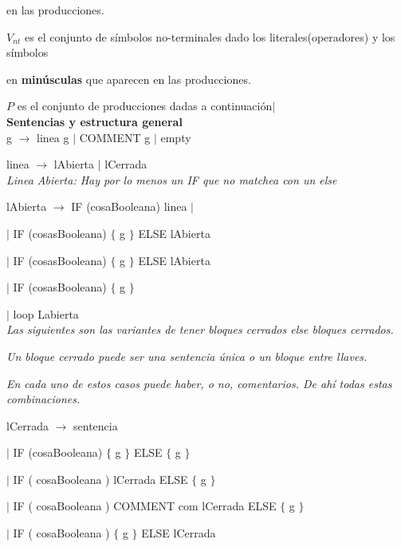en las producciones.


$V_{nt}$ es el conjunto de símbolos no-terminales dado los literales(operadores) y los símbolos

en \textbf{minúsculas} que aparecen en las producciones.



$P$ es el conjunto de producciones dadas a continuación$|$\\


\textbf{Sentencias y estructura general} \\

g $\rightarrow$ linea g $|$ COMMENT g $|$ empty 

linea $\rightarrow$ lAbierta $|$ lCerrada \\


\textit{Linea Abierta: Hay por lo menos un IF que no matchea con un else} 

lAbierta $\rightarrow$ IF (cosaBooleana) linea $|$

\hspace{15mm}$|$ IF (cosasBooleana) $\{$ g $\}$ ELSE lAbierta

\hspace{15mm}$|$ IF (cosasBooleana) $\{$ g $\}$ ELSE lAbierta

\hspace{15mm}$|$ IF (cosasBooleana) $\{$ g $\}$ 

\hspace{15mm}$|$ loop Labierta \\

\textit{Las siguientes son las variantes de tener bloques cerrados else bloques cerrados.}

\textit{Un bloque cerrado puede ser una sentencia única o un bloque entre llaves.}

\textit{En cada uno de estos casos puede haber, o no, comentarios. De ahí todas estas combinaciones.} 


lCerrada $\rightarrow$ sentencia

\hspace{15mm}$|$ IF (cosaBooleana) $\{$ g $\}$ ELSE $\{$ g $\}$

\hspace{15mm}$|$ IF ( cosaBooleana ) lCerrada ELSE $\{$ g $\}$ 

\hspace{15mm}$|$ IF ( cosaBooleana ) COMMENT com lCerrada ELSE $\{$ g $\}$ 

\hspace{15mm}$|$ IF ( cosaBooleana ) $\{$ g $\}$ ELSE lCerrada 

